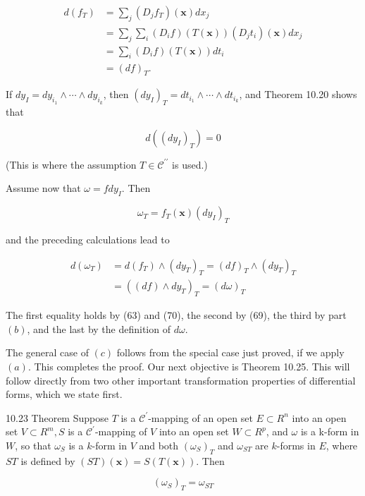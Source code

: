 \documentclass[10pt]{article}
\begin{document}
$$
\begin{aligned}
d\left(f_{T}\right) & =\sum_{j}\left(D_{j} f_{T}\right)(\mathbf{x}) d x_{j} \\
& =\sum_{j} \sum_{i}\left(D_{i} f\right)(T(\mathbf{x}))\left(D_{j} t_{i}\right)(\mathbf{x}) d x_{j} \\
& =\sum_{i}\left(D_{i} f\right)(T(\mathbf{x})) d t_{i} \\
& =(d f)_{T} .
\end{aligned}
$$

If $d y_{I}=d y_{i_{1}} \wedge \cdots \wedge d y_{i_{k}}$, then $\left(d y_{I}\right)_{T}=d t_{i_{1}} \wedge \cdots \wedge d t_{i_{k}}$, and Theorem 10.20 shows that

$$
d\left(\left(d y_{I}\right)_{T}\right)=0
$$

(This is where the assumption $T \in \mathscr{C}^{\prime \prime}$ is used.)

Assume now that $\omega=f d y_{I}$. Then

$$
\omega_{T}=f_{T}(\mathbf{x})\left(d y_{I}\right)_{T}
$$

and the preceding calculations lead to

$$
\begin{aligned}
d\left(\omega_{T}\right) & =d\left(f_{T}\right) \wedge\left(d y_{T}\right)_{T}=(d f)_{T} \wedge\left(d y_{T}\right)_{T} \\
& =\left((d f) \wedge d y_{T}\right)_{T}=(d \omega)_{T}
\end{aligned}
$$

The first equality holds by (63) and (70), the second by (69), the third by part $(b)$, and the last by the definition of $d \omega$.

The general case of $(c)$ follows from the special case just proved, if we apply $(a)$. This completes the proof. Our next objective is Theorem 10.25. This will follow directly from two other important transformation properties of differential forms, which we state first.

10.23 Theorem Suppose $T$ is a $\mathscr{C}^{\prime}$-mapping of an open set $E \subset R^{n}$ into an open set $V \subset R^{m}, S$ is a $\mathscr{C}^{\prime}$-mapping of $V$ into an open set $W \subset R^{p}$, and $\omega$ is a k-form in $W$, so that $\omega_{S}$ is a $k$-form in $V$ and both $\left(\omega_{S}\right)_{T}$ and $\omega_{S T}$ are $k$-forms in $E$, where $S T$ is defined by $(S T)(\mathbf{x})=S(T(\mathbf{x}))$. Then

$$
\left(\omega_{S}\right)_{T}=\omega_{S T}
$$
\end{document}
